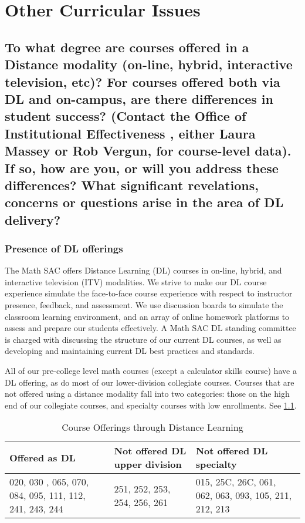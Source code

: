 \chapter{Other  Curricular Issues}
\section[Distance education]{To what degree are courses offered in a Distance modality (on-line, hybrid, interactive television, etc)? For courses offered both via DL and on-campus, are there differences in student success? (Contact the Office of Institutional Effectiveness , either Laura Massey or Rob Vergun,  for course-level data). If so, how are you, or will you address these differences? What significant revelations, concerns or questions arise in the area of DL delivery?}

\subsection{Presence of DL offerings}
The Math SAC offers Distance Learning (DL) courses in on-line, hybrid, and interactive television (ITV) modalities.  We strive to make our DL course experience simulate the face-to-face course experience with respect to instructor presence, feedback, and assessment. We use discussion boards to simulate the classroom learning environment, and an array of online homework platforms to assess and prepare our students effectively. A Math SAC DL standing committee is charged with discussing the structure of our current DL courses, as well as developing and maintaining current DL best practices and standards.

All of our pre-college level math courses (except a calculator skills course) have a DL offering, as do most of our lower-division collegiate courses.  Courses that are not offered using a distance modality fall into two categories: those on the high end of our collegiate courses, and specialty courses with low enrollments. See \cref{tab:sec3:DLofferings}.

\begin{table}
\caption{Course Offerings through Distance Learning}\label{tab:sec3:DLofferings}
\centering
\begin{tabular}{p{1in}p{1in}p{1in}}
\toprule
Offered as DL & Not offered  DL upper division & Not offered  DL specialty\\
\midrule
020, 030 , 065, 070, 084, 095, 111, 112, 241, 243, 244&
251, 252, 253, 254, 256, 261&
015, 25C, 26C, 061, 062, 063, 093, 105, 211, 212, 213\\
\bottomrule
\end{tabular}
\end{table}

